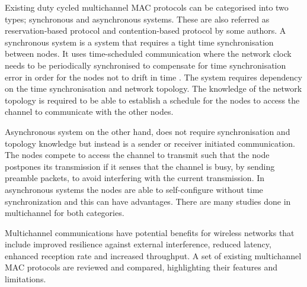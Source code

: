 
Existing duty cycled multichannel MAC protocols can be categorised into two types; synchronous and asynchronous systems. These are also referred as reservation-based protocol and contention-based protocol by some authors. A synchronous system is a system that requires a tight time synchronisation between nodes. It uses time-scheduled communication where the network clock needs to be periodically synchronised to compensate for time synchronisation error in order for the nodes not to drift in time \cite{y-mac}. The system requires dependency on the time synchronisation and network topology. The knowledge of the network topology is required to be able to establish a schedule for the nodes to access the channel to communicate with the other nodes.


Asynchronous system on the other hand, does not require synchronisation and topology knowledge but instead is a sender or receiver initiated communication. The nodes compete to access the channel to transmit such that the node postpones its transmission if it senses that the channel is busy, by sending preamble packets, to avoid interfering with the current transmission. In asynchronous systems the nodes are able to self-configure without time synchronization and this can have advantages. There are many studies done in multichannel for both categories.

Multichannel communications have potential benefits for wireless networks that include improved resilience against external interference, reduced latency, enhanced reception rate and increased throughput. A set of existing multichannel MAC protocols are reviewed and compared, highlighting their features and limitations.

